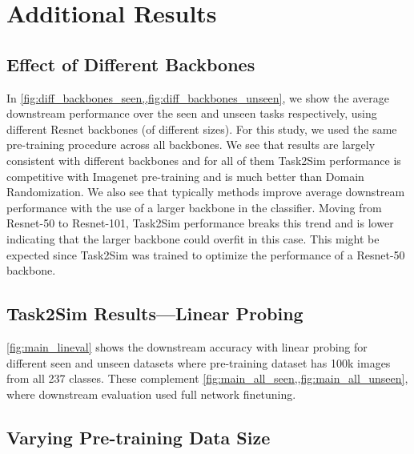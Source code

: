 \section{Additional Results}

\subsection{Effect of Different Backbones} \label{subsec:diff_backbones}




In \cref{fig:diff_backbones_seen,,fig:diff_backbones_unseen}, we show the average downstream performance over the seen and unseen tasks respectively, using different Resnet backbones (of different sizes). For this study, we used the same pre-training procedure across all backbones. We see that results are largely consistent with different backbones and for all of them Task2Sim performance is competitive with Imagenet pre-training and is much better than Domain Randomization. We also see that typically methods improve average downstream performance with the use of a larger backbone in the classifier. Moving from Resnet-50 to Resnet-101, Task2Sim performance breaks this trend and is lower indicating that the larger backbone could overfit in this case. This might be expected since Task2Sim was trained to optimize the performance of a Resnet-50 backbone.




\subsection{Task2Sim Results---Linear Probing} 



\cref{fig:main_lineval} shows the downstream accuracy with linear probing for different seen and unseen datasets where pre-training dataset has 100k images from all 237 classes. These complement \cref{fig:main_all_seen,,fig:main_all_unseen}, where downstream evaluation used full network finetuning. 

\subsection{Varying Pre-training Data Size}





